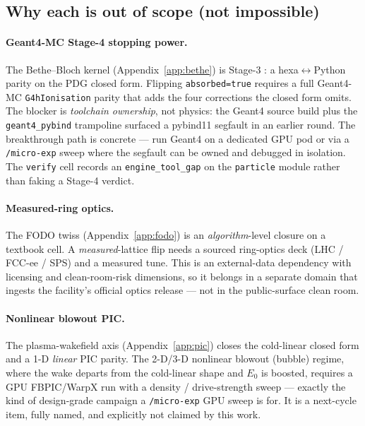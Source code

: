 \subsection{Why each is out of scope (not impossible)}
\label{app:downstream-why}

\paragraph{Geant4-MC Stage-4 stopping power.} The Bethe--Bloch kernel
(Appendix~\ref{app:bethe}) is Stage-3 \tierGreen: a
hexa$\leftrightarrow$Python parity on the PDG closed form. Flipping
\texttt{absorbed=true} requires a full Geant4-MC \texttt{G4hIonisation}
parity that adds the four corrections the closed form omits. The blocker
is \emph{toolchain ownership}, not physics: the Geant4 source build plus
the \texttt{geant4\_pybind} trampoline surfaced a pybind11 segfault in an
earlier round. The breakthrough path is concrete --- run Geant4 on a
dedicated GPU pod or via a \texttt{/micro-exp} sweep where the segfault
can be owned and debugged in isolation. The \texttt{verify} cell records
an \texttt{engine\_tool\_gap} on the \texttt{particle} module rather than
faking a Stage-4 verdict.

\paragraph{Measured-ring optics.} The FODO twiss
(Appendix~\ref{app:fodo}) is an \emph{algorithm}-level closure on a
textbook cell. A \emph{measured}-lattice flip needs a sourced ring-optics
deck (LHC / FCC-ee / SPS) and a measured tune. This is an external-data
dependency with licensing and clean-room-risk dimensions, so it belongs
in a separate domain that ingests the facility's official optics release
--- not in the public-surface clean room.

\paragraph{Nonlinear blowout PIC.} The plasma-wakefield axis
(Appendix~\ref{app:pic}) closes the cold-linear closed form and a 1-D
\emph{linear} PIC parity. The 2-D/3-D nonlinear blowout (bubble) regime,
where the wake departs from the cold-linear shape and $E_0$ is boosted,
requires a GPU FBPIC/WarpX run with a density / drive-strength sweep ---
exactly the kind of design-grade campaign a \texttt{/micro-exp} GPU
sweep is for. It is a next-cycle item, fully named, and explicitly not
claimed by this work.

\medskip
\noindent{}
